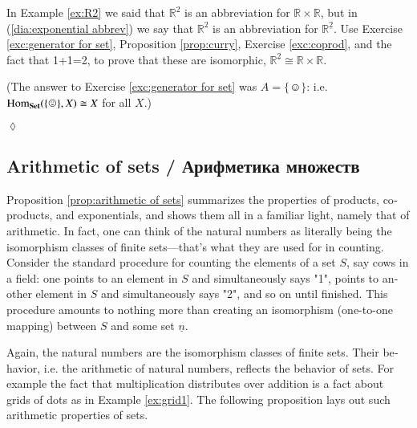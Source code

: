 \documentclass{book}
\def\tn{\textnormal}
\def\RR{{\mathbb R}}
\def\Hom{\tn{Hom}}
\def\singleton{\{\smiley\}}
\def\iso{\cong}
\def\ul{\underline}
\def\Set{{\bf Set}}
\theoremstyle{theoremENG}
\theoremstyle{lemmaENG}
\theoremstyle{propositionENG}
\theoremstyle{corollaryENG}
\theoremstyle{factENG}
\theoremstyle{remarkENG}
\theoremstyle{exampleENG}
\theoremstyle{warningENG}
\theoremstyle{questionENG}
\theoremstyle{guessENG}
\theoremstyle{answerENG}
\theoremstyle{constructionENG}
\theoremstyle{rulesENG}
\theoremstyle{excENG}
\newtheorem{excENG}[subsubsection]{\begin{english}Exercise\end{english}}
\theoremstyle{appENG}
\theoremstyle{definitionENG}
\theoremstyle{notationENG}
\theoremstyle{conjectureENG}
\theoremstyle{postulateENG}
\newenvironment{exerciseENG}{\begin{excENG}}{\hspace*{\fill}$\lozenge$\end{excENG}}
\theoremstyle{theoremRUS}
\theoremstyle{lemmaRUS}
\theoremstyle{propositionRUS}
\theoremstyle{corollaryRUS}
\theoremstyle{factRUS}
\theoremstyle{remarkRUS}
\theoremstyle{exampleRUS}
\theoremstyle{warningRUS}
\theoremstyle{questionRUS}
\theoremstyle{guessRUS}
\theoremstyle{answerRUS}
\theoremstyle{constructionRUS}
\theoremstyle{rulesRUS}
\theoremstyle{excRUS}
\theoremstyle{appRUS}
\theoremstyle{definitionRUS}
\theoremstyle{notationRUS}
\theoremstyle{conjectureRUS}
\theoremstyle{postulateRUS}
\begin{document}
\begin{english}
\begin{exerciseENG}\label{exc:two R2s}

In Example \ref{ex:R2} we said that $\RR^2$ is an abbreviation for $\RR\times\RR$, but in (\ref{dia:exponential abbrev}) we say that $\RR^2$ is an abbreviation for $\RR^{\ul{2}}$. Use Exercise \ref{exc:generator for set}, Proposition \ref{prop:curry}, Exercise \ref{exc:coprod}, and the fact that 1+1=2, to prove that these are isomorphic, $\RR^{\ul{2}}\iso\RR\times\RR$.

\begin{russian} \end{russian}

(The answer to Exercise \ref{exc:generator for set} was $A=\singleton$: i.e. $\Hom_\Set(\singleton,X)\iso X$ for all $X$.)

\begin{russian} \end{russian}

\end{exerciseENG}


\subsection{Arithmetic of sets / Арифметика множеств}\label{sec:arithmetic of sets}

Proposition \ref{prop:arithmetic of sets} summarizes the properties of products, coproducts, and exponentials, and shows them all in a familiar light, namely that of arithmetic. In fact, one can think of the natural numbers as literally being the isomorphism classes of finite sets---that's what they are used for in counting. Consider the standard procedure for counting the elements of a set $S$, say cows in a field: one points to an element in $S$ and simultaneously says "1", points to another element in $S$ and simultaneously says "2", and so on until finished. This procedure amounts to nothing more than creating an isomorphism (one-to-one mapping) between $S$ and some set $\ul{n}$. 

\begin{russian} \end{russian}

Again, the natural numbers are the isomorphism classes of finite sets. Their behavior, i.e. the arithmetic of natural numbers, reflects the behavior of sets. For example the fact that multiplication distributes over addition is a fact about grids of dots as in Example \ref{ex:grid1}. The following proposition lays out such arithmetic properties of sets.


\end{english}
\end{document}
